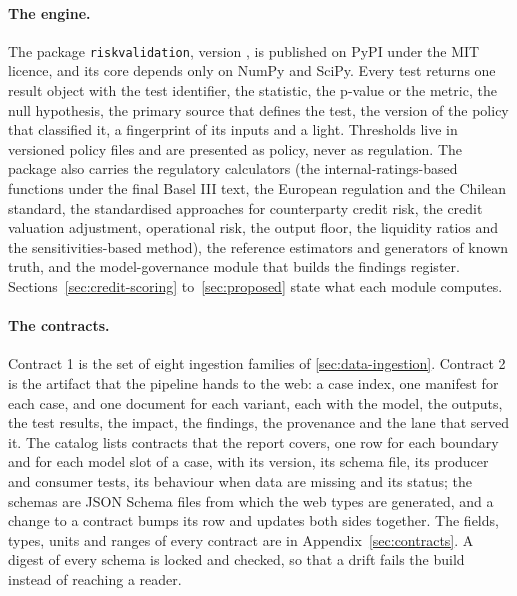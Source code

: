 \paragraph{The engine.} The package \texttt{riskvalidation}, version \rsEngineRv{}, is published on PyPI under the MIT licence, and its core depends only on NumPy and SciPy. Every test returns one result object with the test identifier, the statistic, the p-value or the metric, the null
hypothesis, the primary source that defines the test, the version of the policy that classified it, a fingerprint of its inputs and a light. Thresholds live in versioned policy files and are presented as policy, never as regulation. The package also
carries the regulatory calculators (the internal-ratings-based functions under the final Basel III text, the European regulation and the Chilean standard, the standardised approaches for counterparty credit risk, the credit valuation adjustment, operational risk, the output floor, the liquidity ratios and the sensitivities-based method), the reference
estimators and generators of known truth, and the model-governance module that builds the findings register. Sections~\ref{sec:credit-scoring} to~\ref{sec:proposed} state what each module computes.

\paragraph{The contracts.} Contract 1 is the set of eight ingestion families of \cref{sec:data-ingestion}. Contract 2 is the artifact that the pipeline hands to the web: a case index, one manifest for each case, and one document for each variant, each with the model, the outputs, the
test results, the impact, the findings, the provenance and the lane that served it. The catalog lists \rsContracts{} contracts that the report covers, one row for each boundary and for each model slot of a case, with its version, its schema file, its producer and consumer tests, its behaviour when data are missing and its status; the schemas are JSON Schema files from which the web types are generated, and a change
to a contract bumps its row and updates both sides together. The fields, types, units and ranges of every contract are in Appendix~\ref{sec:contracts}. A digest of every schema is locked and checked, so that a drift fails the build instead of reaching a reader.

